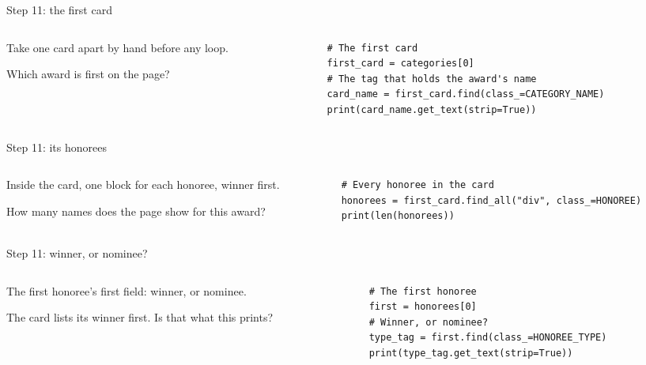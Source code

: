 \documentclass[9pt,aspectratio=169]{beamer}
\begin{document}
\begin{frame}[fragile]{Step 11: the first card}
    \begin{columns}[T]
        \begin{column}{0.37\textwidth}
            Take one card apart by hand before any loop.

            \medskip
            Which award is first on the page?
        \end{column}
        \begin{column}{0.6\textwidth}
\begin{lstlisting}
# The first card
first_card = categories[0]
# The tag that holds the award's name
card_name = first_card.find(class_=CATEGORY_NAME)
print(card_name.get_text(strip=True))
\end{lstlisting}
        \end{column}
    \end{columns}
\end{frame}

\begin{frame}[fragile]{Step 11: its honorees}
    \begin{columns}[T]
        \begin{column}{0.37\textwidth}
            Inside the card, one block for each honoree, winner first.

            \medskip
            How many names does the page show for this award?
        \end{column}
        \begin{column}{0.6\textwidth}
\begin{lstlisting}
# Every honoree in the card
honorees = first_card.find_all("div", class_=HONOREE)
print(len(honorees))
\end{lstlisting}
        \end{column}
    \end{columns}
\end{frame}

\begin{frame}[fragile]{Step 11: winner, or nominee?}
    \begin{columns}[T]
        \begin{column}{0.37\textwidth}
            The first honoree's first field: winner, or nominee.

            \medskip
            The card lists its winner first. Is that what this prints?
        \end{column}
        \begin{column}{0.6\textwidth}
\begin{lstlisting}
# The first honoree
first = honorees[0]
# Winner, or nominee?
type_tag = first.find(class_=HONOREE_TYPE)
print(type_tag.get_text(strip=True))
\end{lstlisting}
        \end{column}
    \end{columns}
\end{frame}
\end{document}
